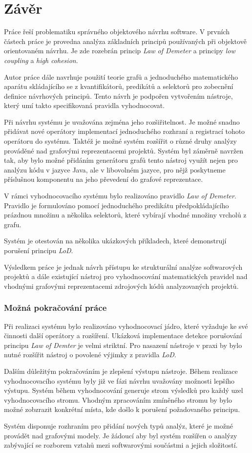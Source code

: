 \chapter{Závěr}

Práce řeší problematiku správného objektového návrhu software. V prvních částech práce je provedna analýza základních principů používaných při objektově orientovaném návrhu. Je zde rozebrán princip \emph{Law of Demeter} a principy \emph{low coupling} a \emph{high cohesion}.

Autor práce dále navrhuje použití teorie grafů a jednoduchého matematického aparátu skládajícího se z kvantifikátorů, predikátů a selektorů pro zobecnění definice návrhových principů. Tento návrh je podpořen vytvořením nástroje, který umí takto specifikovaná pravidla vyhodnocovat.

Při návrhu systému je uvažována zejména jeho rozšiřitelnost. Je možné snadno přidávat nové operátory implementací jednoduchého rozhraní a registrací tohoto operátoru do systému. Taktéž je možné systém rozšířit o různé druhy analýzy prováděné nad grafovými reprezentacemi projektů. Systém byl záměrně navržen tak, aby bylo možné přidáním generátoru grafů tento nástroj využít nejen pro analýzu kódu v jazyce Java, ale v libovolném jazyce, pro nějž poskytneme příslušnou komponentu na jeho převedení do grafové reprezentace.

V rámci vyhodnocovacího systému bylo realizováno pravidlo \emph{Law of Demeter}. Pravidlo je formulováno pomocí jednoduchého predikátu předpokládajícího prázdnou množinu a několika selektorů, které vybírají vhodné množiny vrcholů z grafu.

Systém je otestován na několika ukázkových příkladech, které demonstrují porušení principu \emph{LoD}.

Výsledkem práce je jednak návrh přístupu ke strukturální analýze softwarových projektů a dále existující nástroj pro vyhodnocování matematických pravidel nad vhodnými grafovými reprezentacemi zdrojových kódů analyzovaných projektů.

\subsection*{Možná pokračování práce}
Při realizaci systému bylo realizováno vyhodnocovací jádro, které vyžaduje ke své činnosti další operátory a rozšíření. Ukázková implementace detekce porušování principu \emph{Law of Demter} je velmi striktní. Pro nasazení nástroje v praxi by bylo nutné rozšířit nástroj o povolené výjimky z pravidla \emph{LoD}.

Dalším důležitým pokračováním je zlepšení výstupu nástroje. Během realizace vyhodnocovacího systému byly již ve fázi návrhu uvažovány možnosti lepšího výstupu. Systém během vyhodnocování generuje strom výsledků pro každý uzel vyhodnocovacího stromu. Vhodným zpracováním zmíněného stromu by bylo možné zobzrazit konkrétní místa, kde došlo k porušení požadovaného principu.

Systém disponuje rozhraním pro přidání nových typů analýz, které je možné provádět nad grafovými modely. Je žádoucí aby byl systém rozšířen o analýzy zabývající se rozborem vztahů mezi softwarovými součástmi a jejich složitostí.
